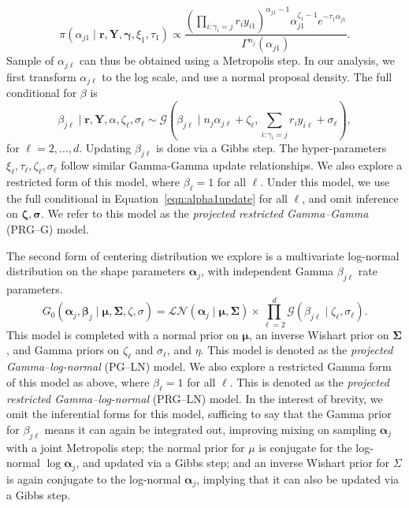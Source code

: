\begin{equation}
    \label{eqn:alpha1update}
    \pi(\alpha_{j1}\mid\bm{r},\bm{Y},\bm{\gamma},\xi_1,\tau_1) \propto \frac{\left(\prod_{i:\gamma_i = j}r_iy_{i1}\right)^{\alpha_{j1} - 1}\alpha_{j1}^{\zeta_1 - 1}e^{-\tau_1\alpha_{j1}}}{\Gamma^{n_j}(\alpha_{j1})}.
\end{equation}
Sample of $\alpha_{j\ell}$ can thus be obtained using a Metropolis step. In our analysis, we first transform $\alpha_{j\ell}$ to the log scale, and use a normal proposal density.
The full conditional for $\beta$ is 
\begin{equation}
    \beta_{j\ell}\mid\bm{r},\bm{Y},\alpha,\zeta_{\ell},\sigma_{\ell} \sim \mathcal{G}\left(\beta_{j\ell}\mid n_j\alpha_{j\ell} + \zeta_\ell, \sum_{i:\gamma_i = j}r_iy_{i\ell} + \sigma_{\ell}\right),
\end{equation}
for $\ell = 2,\ldots, d$.  Updating $\beta_{j\ell}$ is done via a Gibbs step.  The hyper-parameters $\xi_{\ell},\tau_{\ell},\zeta_{\ell},\sigma_{\ell}$ follow similar Gamma-Gamma update relationships.  We also explore a restricted form of this model, where $\beta_{\ell} = 1$ for all $\ell$.  Under this model, we use the full conditional in Equation~\ref{eqn:alpha1update} for all $\ell$, and omit inference on $\bm{\zeta},\bm{\sigma}$.  We refer to this model as the \emph{projected restricted Gamma--Gamma} (PRG--G) model.

The second form of centering distribution we explore is a multivariate log-normal distribution on the shape parameters $\bm{\alpha}_j$, with independent Gamma $\beta_{j\ell}$ rate parameters.  
\begin{equation}
    G_0\left(\bm{\alpha}_j,\bm{\beta}_j\mid\bm{\mu},\bm{\Sigma},\zeta,\sigma\right) = \mathcal{LN}\left(\bm{\alpha}_j\mid\bm{\mu},\bm{\Sigma}\right)\times\prod_{\ell = 2}^d\mathcal{G}\left(\beta_{j\ell}\mid\zeta_{\ell},\sigma_{\ell}\right).
\end{equation}
This model is completed with a normal prior on $\bm{\mu}$, an inverse Wishart prior on $\bm{\Sigma}$, and Gamma priors on $\zeta_{\ell}$ and $\sigma_{\ell}$, and $\eta$.  This model is denoted as the \emph{projected Gamma--log-normal} (PG--LN) model.  We also explore a restricted Gamma form of this model as above, where $\beta_{\ell} = 1$ for all $\ell$.  This is denoted as the \emph{projected restricted Gamma--log-normal} (PRG--LN) model.  In the interest of brevity, we omit the inferential forms for this model, sufficing to say that the Gamma prior for $\beta_{j\ell}$ means it can again be integrated out, improving mixing on sampling $\bm{\alpha}_j$ with a joint Metropolis step; the normal prior for $\mu$ is conjugate for the log-normal $\log\bm{\alpha}_j$, and updated via a Gibbs step; and an inverse Wishart prior for $\Sigma$ is again conjugate to the log-normal $\bm{\alpha}_j$, implying that it can also be updated via a Gibbs step.

